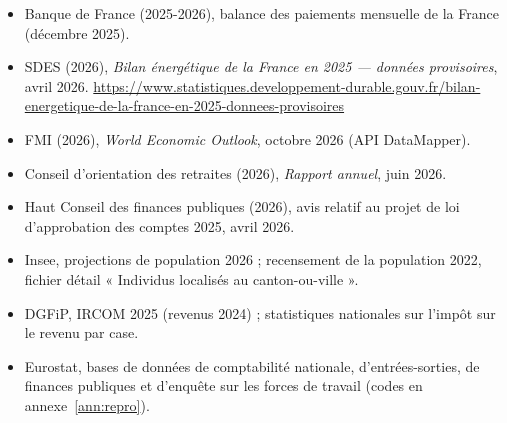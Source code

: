 \begin{small}
\begin{itemize}[leftmargin=1em]
\item Banque de France (2025-2026), balance des paiements mensuelle de la France (décembre 2025).
\item SDES (2026), \emph{Bilan énergétique de la France en 2025 — données provisoires}, avril 2026.
\url{https://www.statistiques.developpement-durable.gouv.fr/bilan-energetique-de-la-france-en-2025-donnees-provisoires}
\item FMI (2026), \emph{World Economic Outlook}, octobre 2026 (API DataMapper).
\item Conseil d'orientation des retraites (2026), \emph{Rapport annuel}, juin 2026.
\item Haut Conseil des finances publiques (2026), avis relatif au projet de loi d'approbation des comptes 2025, avril 2026.
\item Insee, projections de population 2026 ; recensement de la population 2022, fichier détail « Individus localisés au
canton-ou-ville ».
\item DGFiP, IRCOM 2025 (revenus 2024) ; statistiques nationales sur l'impôt sur le revenu par case.
\item Eurostat, bases de données de comptabilité nationale, d'entrées-sorties, de finances publiques et d'enquête sur
les forces de travail (codes en annexe~\ref{ann:repro}).
\end{itemize}


\end{small}
